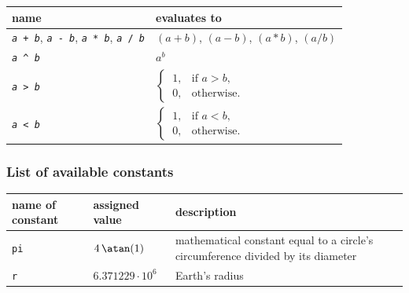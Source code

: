 \begin{tabular}{|p{3cm}|p{7cm}|}
  \hline
  name                              & evaluates to \\
  \hline\hline
  \raggedright%
  \texttt{\textit{a}~+~\textit{b}},
  \texttt{\textit{a}~-~\textit{b}},
  \texttt{\textit{a}~*~\textit{b}},
  \texttt{\textit{a}~/~\textit{b}}  & $(a+b)$, $(a-b)$, $(a*b)$, $(a/b)$ \\[0.5em]
  \texttt{\textit{a}~\^~\textit{b}} & $a^b$                              \\[0.5em]
  \texttt{\textit{a}~>~\textit{b}}  & $\begin{cases}
                                        ~  1, & \text{if } a > b, \\
                                        ~  0, & \text{otherwise}.
                                       \end{cases}$                      \\[1.5em]
  \texttt{\textit{a}~<~\textit{b}}  & $\begin{cases}
                                        ~  1, & \text{if } a < b, \\
                                        ~  0, & \text{otherwise}.
                                       \end{cases}$                      \\[0.5em]
  \hline
\end{tabular}



\subsubsection{List of available constants}

\begin{tabular}{|l|l|p{7cm}|}
  \hline
  name of constant & assigned value & description \\
  \hline\hline
  \texttt{pi} & $4 \, \atan(1)$     & mathematical constant equal to a circle's circumference 
                                      divided by its diameter  \\
  \texttt{r}  & $6.371229\cdot10^6$ & Earth's radius\footnotemark[1]  \\
  \hline
\end{tabular}



